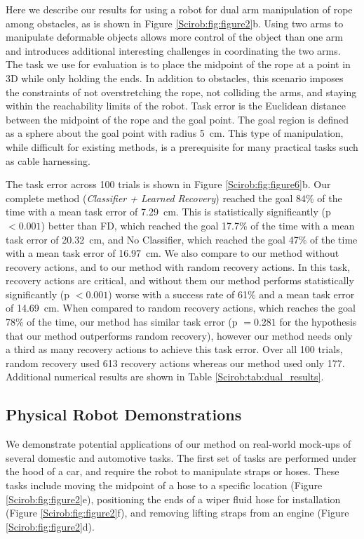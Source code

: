 Here we describe our results for using a robot for dual arm manipulation of rope among obstacles, as is shown in Figure \ref{Scirob:fig:figure2}b. Using two arms to manipulate deformable objects allows more control of the object than one arm and introduces additional interesting challenges in coordinating the two arms. The task we use for evaluation is to place the midpoint of the rope at a point in 3D while only holding the ends. In addition to obstacles, this scenario imposes the constraints of not overstretching the rope, not colliding the arms, and staying within the reachability limits of the robot. Task error is the Euclidean distance between the midpoint of the rope and the goal point. The goal region is defined as a sphere about the goal point with radius \SI{5}{\centi\meter}. This type of manipulation, while difficult for existing methods, is a prerequisite for many practical tasks such as cable harnessing.

The task error across 100 trials is shown in Figure \ref{Scirob:fig:figure6}b. Our complete method (\textit{Classifier + Learned Recovery}) reached the goal 84\% of the time with a mean task error of \SI{7.29}{\centi\meter}. This is statistically significantly (p $<0.001$) better than FD, which reached the goal 17.7\% of the time with a mean task error of \SI{20.32}{\centi\meter}, and No Classifier, which reached the goal 47\% of the time with a mean task error of \SI{16.97}{\centi\meter}. We also compare to our method without recovery actions, and to our method with random recovery actions. In this task, recovery actions are critical, and without them our method performs statistically significantly (p $<0.001$) worse with a success rate of 61\% and a mean task error of \SI{14.69}{\centi\meter}. When compared to random recovery actions, which reaches the goal 78\% of the time, our method has similar task error (p $= 0.281$ for the hypothesis that our method outperforms random recovery), however our method needs only a third as many recovery actions to achieve this task error. Over all 100 trials, random recovery used 613 recovery actions whereas our method used only 177. Additional numerical results are shown in Table \ref{Scirob:tab:dual_results}.

\subsection{Physical Robot Demonstrations}
We demonstrate potential applications of our method on real-world mock-ups of several domestic and automotive tasks. The first set of tasks are performed under the hood of a car, and require the robot to manipulate straps or hoses. These tasks include moving the midpoint of a hose to a specific location (Figure \ref{Scirob:fig:figure2}e), positioning the ends of a wiper fluid hose for installation (Figure \ref{Scirob:fig:figure2}f), and removing lifting straps from an engine (Figure \ref{Scirob:fig:figure2}d).

